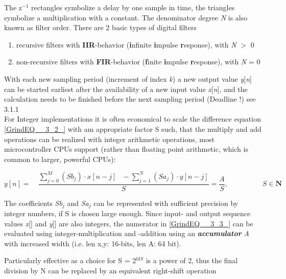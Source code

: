 The z${}^{-1}$ rectangles symbolize a delay by one sample in time, the triangles symbolize a multiplication with a constant. The denominator degree \textit{N} is also known as filter order. There are 2 basic types of digital filters 

\begin{enumerate}
\item  recursive filters with \textbf{IIR}-behavior (\textbf{i}nfinite \textbf{i}mpulse \textbf{r}esponse), with \textit{N} $\mathrm{>}$ 0

\item  non-recursive filters with \textbf{FIR}-behavior (\textbf{f}inite \textbf{i}mpulse \textbf{r}esponse), with \textit{N} = 0
\end{enumerate}

With each new sampling period (increment of index \textit{k}) a new output value \textit{y}[\textit{n}] can be started earliest after the availability of a new input value \textit{x}[\textit{n}], and the calculation needs to be finished before the next sampling period (Deadline !)  see 3.1.1\\

For Integer implementations it is often economical to scale the difference equation \eqref{GrindEQ__3_2_} with am appropriate factor S such, that the multiply and add operations can be realized with integer arithmetic operations, most microcontroller CPUs support (rather than floating point arithmetic, which is common to larger, powerful CPUs):

\begin{equation}
	y[n]=\quad \frac{\sum _{j=0}^{M}(Sb_{j} )\cdot x[n-j] \; \; \, -\sum _{j=1}^{N}(Sa_{j} )\cdot y[n-j] }{S} =\frac{A}{S}   ,  \hspace{2cm}  \textit{S} \in \textbf{N}
\label{EQ }
\end{equation}

The coefficients \textit{Sb${}_{j}$ }and \textit{Sa${}_{j}$} can be represented with sufficient precision by integer numbers, if S is chosen large enough. Since input- and output sequence values \textit{x}[] and \textit{y}[] are also integers, the numerator in \eqref{GrindEQ__3_3_} can be evaluated using integer-multiplication and -addition using an \textbf{\textit{accumulator}} \textit{A} with increased width (i.e. len x,y: 16-bits, len A: 64 bit). 

Particularly effective as a choice for S = 2\textit{${}^{ldS}$} is a power of 2, thus the final division by N can be replaced by an equivalent right-shift operation  

